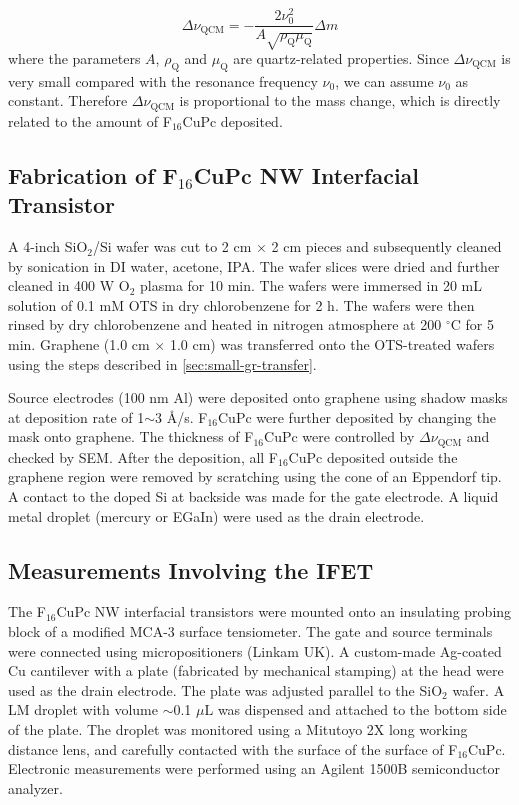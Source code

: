 \begin{equation}
\label{eq:small-1}
\Delta \nu_{\mathrm{QCM}} = -\frac{2 \nu_{0}^{2}}{A \sqrt{\rho_{\mathrm{Q}} \mu_{\mathrm{Q}}}} \Delta m
\end{equation}
where the parameters \(A\), \(\rho_{\mathrm{Q}}\) and \(\mu_{\mathrm{Q}}\)
are quartz-related properties. Since \(\Delta \nu_{\mathrm{QCM}}\) is very
small compared with the resonance frequency \(\nu_{0}\), we can assume
\(\nu_{0}\) as constant. Therefore \(\Delta \nu_{\mathrm{QCM}}\) is
proportional to the mass change, which is directly related to the
amount of F\(_{\text{16}}\)CuPc deposited.

\subsection{Fabrication of F\(_{\text{16}}\)CuPc NW Interfacial Transistor}
\label{sec:small-orgdb060bd}

A 4-inch SiO\(_{\text{2}}\)/Si wafer was cut to 2 cm \(\times\) 2 cm pieces and subsequently
cleaned by sonication in DI water, acetone, IPA. The wafer slices were dried
and further cleaned in 400 W O\(_{\text{2}}\) plasma for 10 min. The wafers were
immersed in 20 mL solution of 0.1 mM OTS in dry chlorobenzene for 2
h. The wafers were then rinsed by dry chlorobenzene and heated in
nitrogen atmosphere at 200 \(^{\circ}\mathrm{C}\) for 5 min. Graphene
(1.0 cm \(\times\) 1.0 cm) was transferred onto the OTS-treated wafers
using the steps described in \autoref{sec:small-gr-transfer}.

Source electrodes (100 nm Al) were deposited onto graphene using
shadow masks at deposition rate of 1\(\sim\)3 \AA{}/s. F\(_{\text{16}}\)CuPc were further
deposited by changing the mask onto graphene. The thickness of
F\(_{\text{16}}\)CuPc were controlled by \(\Delta \nu_{\mathrm{QCM}}\) and checked by
SEM. After the deposition, all F\(_{\text{16}}\)CuPc deposited outside the
graphene region were removed by scratching using the cone of an
Eppendorf tip. A contact to the doped Si at backside was made for the
gate electrode. A liquid metal droplet (mercury or EGaIn) were used as
the drain electrode.

\subsection{Measurements Involving the IFET}
\label{sec:small-orgec772cc}

The F\(_{\text{16}}\)CuPc NW interfacial transistors were mounted onto an
insulating probing block of a modified MCA-3 surface tensiometer. The
gate and source terminals were connected using micropositioners
(Linkam UK). A custom-made Ag-coated Cu cantilever with a plate
(fabricated by mechanical stamping) at the head were used as the drain
electrode. The plate was adjusted parallel to the SiO\(_{\text{2}}\) wafer. A LM
droplet with volume \(\sim\)0.1 \(\mu \mathrm{L}\) was dispensed and
attached to the bottom side of the plate. The droplet was monitored
using a Mitutoyo 2X long working distance lens, and carefully
contacted with the surface of the surface of F\(_{\text{16}}\)CuPc. Electronic
measurements were performed using an Agilent 1500B semiconductor
analyzer.

